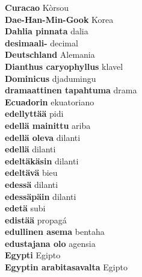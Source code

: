 \textbf{ Curacao  } Kòrsou \\
\textbf{ Dae-Han-Min-Gook  } Korea \\
\textbf{ Dahlia pinnata  } dalia \\
\textbf{ desimaali-  } decimal \\
\textbf{ Deutschland  } Alemania \\
\textbf{ Dianthus caryophyllus  } klavel \\
\textbf{ Dominicus  } djadumingu \\
\textbf{ dramaattinen tapahtuma  } drama \\
\textbf{ Ecuadorin  } ekuatoriano \\
\textbf{ edellyttää  } pidi \\
\textbf{ edellä mainittu  } ariba \\
\textbf{ edellä oleva  } dilanti \\
\textbf{ edellä  } dilanti \\
\textbf{ edeltäkäsin  } dilanti \\
\textbf{ edeltävä  } bieu \\
\textbf{ edessä  } dilanti \\
\textbf{ edessäpäin  } dilanti \\
\textbf{ edetä  } subi \\
\textbf{ edistää  } propagá \\
\textbf{ edullinen asema  } bentaha \\
\textbf{ edustajana olo  } agensia \\
\textbf{ Egypti  } Egipto \\
\textbf{ Egyptin arabitasavalta  } Egipto \\
